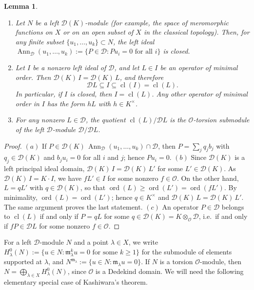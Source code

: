 \documentclass[11pt,reqno]{amsart}
\theoremstyle{plain}
\newtheorem{lemma}{Lemma}[section]
\theoremstyle{definition}
\theoremstyle{remark}
\numberwithin{equation}{section}
\newcommand{\cD}{\mathcal{D}}
\newcommand{\cO}{\mathcal{O}}
\newcommand{\ml}{\mathfrak{m}_\lambda}
\DeclareMathOperator{\Ann}{Ann}
\DeclareMathOperator{\cl}{cl}
\DeclareMathOperator{\ord}{ord}
\begin{document}
\begin{lemma}
\label{L2.4}
\begin{enumerate}
\item[$(a)$] Let $N$ be a left $\cD(K)$-module (for example, the space of meromorphic functions on
$X$ or on an open subset of $X$ in the classical topology). Then, for any finite subset
$\{u_1, \ldots, u_k\} \subset N$, the left ideal
$\Ann_{\cD}(u_1, \ldots, u_k) := \{P \in \cD : P u_i = 0 \text{ for all } i\}$ is closed.
\item[$(b)$] Let $I$ be a nonzero left ideal of $\cD$, and let $L \in I$ be an operator of minimal
order. Then $\cD(K)\, I = \cD(K)\, L$, and therefore
\[
  \cD L \subseteq I \subseteq \cl(I) = \cl(L) .
\]
In particular, if $I$ is closed, then $I = \cl(L)$. Any other operator of minimal order in $I$
has the form $h L$ with $h \in K^\times$.
\item[$(c)$] For any nonzero $L \in \cD$, the quotient $\cl(L)/\cD L$ is the $\cO$-torsion submodule
of the left $\cD$-module $\cD/\cD L$.
\end{enumerate}
\end{lemma}

\begin{proof}
$(a)$ If $P \in \cD(K)\, \Ann_{\cD}(u_1, \ldots, u_k) \cap \cD$, then
$P = \sum_j q_j b_j$ with $q_j \in \cD(K)$ and $b_j u_i = 0$ for all $i$ and $j$; hence
$P u_i = 0$. $(b)$ Since $\cD(K)$ is a left principal ideal domain, $\cD(K)\, I = \cD(K)\, L'$
for some $L' \in \cD(K)$. As $\cD(K)\, I = K \cdot I$, we have $f L' \in I$ for some nonzero
$f \in \cO$. On the other hand, $L = q L'$ with $q \in \cD(K)$, so that
$\ord(L) \ge \ord(L') = \ord(f L')$. By minimality, $\ord(L) = \ord(L')$; hence $q \in K^\times$
and $\cD(K)\, L = \cD(K)\, L'$. The same argument proves the last statement. $(c)$ An operator
$P \in \cD$ belongs to $\cl(L)$ if and only if $P = q L$ for some $q \in \cD(K) = K \otimes_{\cO}
\cD$, i.e.\ if and only if $f P \in \cD L$ for some nonzero $f \in \cO$.
\end{proof}

For a left $\cD$-module $N$ and a point $\lambda \in X$, we write
$H^0_\lambda(N) := \{ u \in N : \ml^k u = 0 \text{ for some } k \ge 1\}$ for the submodule of
elements supported at $\lambda$, and $N^{\ml} := \{u \in N : \ml u = 0\}$. If $N$ is a torsion
$\cO$-module, then $N = \bigoplus_{\lambda \in X} H^0_\lambda(N)$, since $\cO$ is a Dedekind
domain. We will need the following elementary special case of Kashiwara's theorem.
\end{document}
